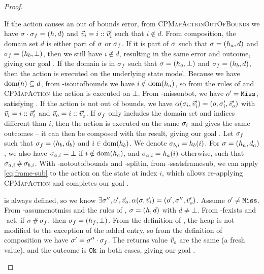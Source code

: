 \begin{proof}
\pfcase{$\alpha\in\actions_\mmdl$}

\begin{hypvlist}
 If the action causes an out of bounds error, from \textsc{CPMapActionOutOfBounds} we have $\sigma\cdot \sigma_f=(h,d)$ and $\vec{v}_i=i::\vec{v}_i'$ such that $i\notin d$.
 From composition, the domain set $d$ is either part of $\sigma$ or $\sigma_f$. If it is part of $\sigma$ such that $\sigma=(h_a, d)$ and $\sigma_f=(h_b, \bot)$, then we still have $i\notin d$, resulting in the same error and outcome, giving our goal .
 If the domain is in $\sigma_f$ such that $\sigma=(h_a,\bot)$ and $\sigma_f=(h_b,d)$, then the action is executed on the underlying state model. Because we have $\operatorname{dom}(h)\subseteq d$, from \hyp{isoutofbounds} we have $i\notin \operatorname{dom}(h_a)$, so from the rules of  and \textsc{CPMapAction} the action is executed on $\bot$. {\color{red}From \hyp{missonbot}, we have $o'=\texttt{Miss}$, satisfying .}
 If the action is not out of bounds, we have $\alpha(\sigma_i,\vec{v}_i')=(o,\sigma_i',\vec{v}_o')$ with $\vec{v}_i=i::\vec{v}_i'$ and $\vec{v}_o=i::\vec{v}_o'$.
 If $\sigma_f$ only includes the domain set and indices different than $i$, then the action is executed on the same $\sigma_i$ and gives the same outcomes -- it can then be composed with the result, giving our goal .
 Let $\sigma_f$ such that $\sigma_f=(h_b,d_b)$ and $i\in\operatorname{dom}(h_b)$. We denote $\sigma_{b,i}=h_b(i)$. For $\sigma=(h_a,d_a)$, we also have $\sigma_{a,i}=\bot$ if $i\notin \operatorname{dom}(h_a)$, and $\sigma_{a,i}=h_a(i)$ otherwise, such that $\sigma_{a,i}\operatorname{\#}\sigma_{b,i}$.
 With \hyp{notoutofbounds} and \hyp{splitin}, from \hyp{ssatsframesub}, we can apply \ref{eq:frame-sub} to the action on the state at index $i$, which allows re-applying \textsc{CPMapAction} and completes our goal .
\end{hypvlist}

\pfcase{$\alpha=\alloc$}

\begin{hypvlist}
 \alloc{} is always defined, so we know $\exists \sigma'',o',\vec{v}_o\ldotp \alpha(\sigma,\vec{v}_i)=(o',\sigma'',\vec{v}_o')$.
 Assume $o'\neq\texttt{Miss}$.
 From \hyp{assumenotmiss} and the rules of \alloc{}, $\sigma=(h,d)$ with $d\neq\bot$.
 From \hyp{fexists} and \hyp{act}, if $\sigma\operatorname{\#}\sigma_f$, then $\sigma_f=(h_f,\bot)$.
 From the definition of \alloc{}, the heap is not modified to the exception of the added entry, so from the definition of composition we have $\sigma'=\sigma''\cdot\sigma_f$. The returns value $\vec{v}_o$ are the same (a fresh value), and the outcome is $\texttt{Ok}$ in both cases, giving our goal .
\end{hypvlist}


\end{proof}
